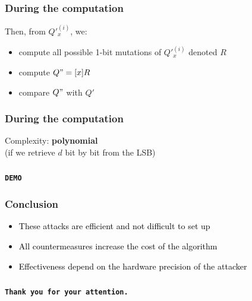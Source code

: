 \documentclass{beamer}
\begin{document}
    \begin{frame}
        \frametitle{During the computation}
        Then, from $Q'_x^{(i)}$, we:
        \begin{itemize}
            \item \color{black} { compute all possible 1-bit mutations of $Q'_x^{(i)}$ denoted $R$ }
            \item \color{black} { compute $Q" = [x]R$}
            \item \color{black} { compare $Q"$ with $Q'$}
        \end{itemize}
    \end{frame}


    \begin{frame}
        \frametitle{During the computation}
        Complexity: {\bf polynomial}\\

        (if we retrieve $d$ bit by bit from the LSB)

    \end{frame}

    \begin{frame}
        \frametitle{}
        \begin{center}
            {\Huge\bf\tt DEMO}
        \end{center}
    \end{frame}

\begin{frame}
    \frametitle{Conclusion}

    \begin{itemize}
        \item \textcolor{black}{These attacks are efficient and not difficult to set up}
        \item \textcolor{black}{All countermeasures increase the cost of the algorithm}
	\item \textcolor{black}{Effectiveness depend on the hardware precision of the attacker}
    \end{itemize}

\end{frame}


\begin{frame}
    \frametitle{}
    \begin{center}
        {\Huge\bf\tt Thank you for your attention.}
    \end{center}
\end{frame}
\end{document}

